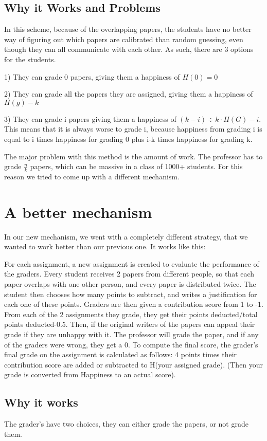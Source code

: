 \documentclass[12pt, Helvetica]{article}
\begin{document}
\subsection{Why it Works and Problems}
In this scheme, because of the overlapping papers, the students have no better way of figuring out which papers are calibrated than random guessing, even though they can all communicate with each other. As such, there are 3 options for the students.

1) They can grade 0 papers, giving them a happiness of $H(0) = 0$

2) They can grade all the papers they are assigned, giving them a happiness of $H(g) - k$

3) They can grade i papers giving them a happiness of $(k-i)\div k \cdot H(G)-i$. This means that it is always worse to grade i, because happiness from grading i is equal to i times happiness for grading 0 plus i-k times happiness for grading k.

The major problem with this method is the amount of work. The professor has to grade $\frac{n}{k}$ papers, which can be massive in a class of 1000+ students. For this reason we tried to come up with a different mechanism.
\section{A better mechanism}
In our new mechanism, we went with a completely different strategy, that we wanted to work better than our previous one. It works like this:

For each assignment, a new assignment is created to evaluate the performance of the graders. Every student receives 2 papers from different people, so that each paper overlaps with one other person, and every paper is distributed twice. The student then chooses how many points to subtract, and writes a justification for each one of these points. Graders are then given a contribution score from 1 to -1. From each of the 2 assignments they grade, they get their points deducted/total points deducted-0.5. Then, if the original writers of the papers can appeal their grade if they are unhappy with it. The professor will grade the paper, and if any of the graders were wrong, they get a 0. To compute the final score, the grader's final grade on the assignment is calculated as follows: 4 points times their contribution score are added or subtracted to H(your assigned grade). (Then your grade is converted from Happiness to an actual score). 
\subsection{Why it works}
The grader's have two choices, they can either grade the papers, or not grade them.
\end{document}
